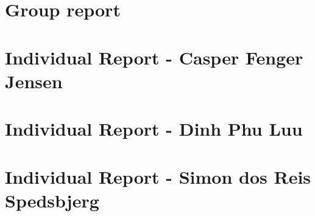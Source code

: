 
\section{Group report}











\newpage


\section{Individual Report - Casper Fenger Jensen}











\newpage


\section{Individual Report - Dinh Phu Luu}











\newpage


\section{Individual Report - Simon dos Reis Spedsbjerg}

